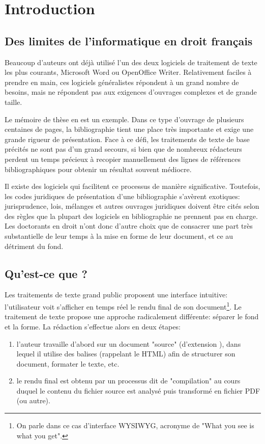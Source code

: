 \documentclass{ltxdockit}
\begin{document}
\printtitlepage
\tableofcontents
\listoftables

\section{Introduction}
\label{int}

\subsection{Des limites de l'informatique en droit français}

Beaucoup d'auteurs ont déjà utilisé l'un des deux logiciels de traitement de texte les plus courants, Microsoft Word ou OpenOffice Writer. Relativement faciles à prendre en main, ces logiciels généralistes répondent à un grand nombre de besoins, mais ne répondent pas aux exigences d'ouvrages complexes et de grande taille.

Le mémoire de thèse en est un exemple. Dans ce type d'ouvrage de plusieurs centaines de pages, la bibliographie tient une place très importante et exige une grande rigueur de présentation. Face à ce défi, les traitements de texte de base précités ne sont pas d'un grand secours, si bien que de nombreux rédacteurs perdent un temps précieux à recopier manuellement des lignes de références bibliographiques pour obtenir un résultat souvent médiocre. 

Il existe des logiciels qui facilitent ce processus de manière significative. Toutefois, les codes juridiques de présentation d'une bibliographie s'avèrent exotiques: jurisprudence, lois, mélanges et autres ouvrages juridiques doivent être cités selon des règles que la plupart des logiciels en bibliographie ne prennent pas en charge. Les doctorants en droit n'ont donc d'autre choix que de consacrer une part très substantielle de leur temps à la mise en forme de leur document, et ce au détriment du fond.

\subsection{Qu'est-ce que \latex ?}

Les traitements de texte grand public proposent une interface intuitive: l’utilisateur voit s'afficher en temps réel le rendu final de son document\footnote{On parle dans ce cas d'interface WYSIWYG, acronyme de "What you see is what you get".}. 
Le traitement de texte \latex propose une approche radicalement différente: séparer le fond et la forme. La rédaction s'effectue alors en deux étapes:
\begin{enumerate}

\item l'auteur travaille d'abord sur un document "source" (d'extension ), dans lequel il utilise des balises (rappelant le HTML) afin de structurer son document, formater le texte, etc.

\item le rendu final est obtenu par un processus dit de "compilation" au cours duquel le contenu du fichier source est analysé puis transformé en fichier PDF (ou autre).

\end{enumerate}
\end{document}
